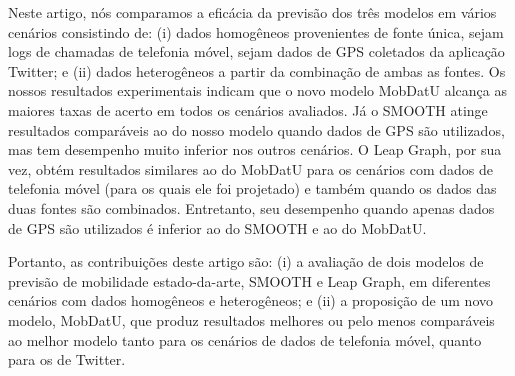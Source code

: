 \documentclass[10pt, a4paper, onecolumn, conference, compsocconf]{IEEEtran}
\begin{document}

Neste artigo, nós comparamos a eficácia da previsão dos três modelos em vários cenários consistindo de: (i) dados homogêneos provenientes de fonte única, sejam logs de chamadas de telefonia móvel, sejam dados de GPS coletados da aplicação Twitter; e (ii) dados heterogêneos a partir da combinação de ambas as fontes.  Os nossos resultados experimentais indicam que o novo modelo MobDatU alcança as maiores taxas de acerto em todos os cenários avaliados. Já o SMOOTH  atinge resultados comparáveis ao do nosso modelo quando dados de GPS são utilizados, mas tem desempenho muito inferior nos outros cenários. O Leap  Graph, por sua vez, obtém resultados similares ao do MobDatU para os cenários com dados de telefonia móvel (para os quais ele foi projetado) e também quando os dados das duas fontes são combinados. Entretanto, seu desempenho quando apenas dados  de GPS  são utilizados é inferior ao do SMOOTH e ao do MobDatU. 




Portanto, as contribuições deste artigo são: (i) a avaliação de dois modelos de previsão de mobilidade estado-da-arte, SMOOTH e Leap Graph, em diferentes cenários com dados homogêneos e heterogêneos; e (ii) a proposição de um novo modelo, MobDatU, que produz resultados melhores ou pelo menos comparáveis ao melhor modelo tanto para os cenários de dados de telefonia móvel, quanto para os de Twitter.
\end{document}
